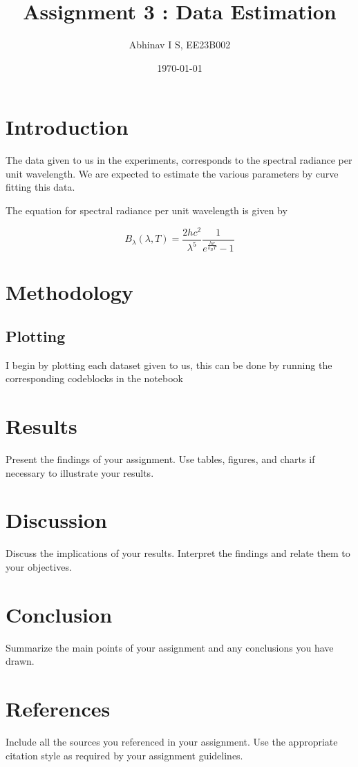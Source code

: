 \documentclass[a4paper,12pt]{article}
\title{Assignment 3 : Data Estimation}
\author{Abhinav I S, EE23B002}
\date{\today}
\begin{document}
\maketitle

\begin{abstract}
    
\end{abstract}

\section{Introduction}
The data given to us in the experiments, corresponds to the spectral radiance per 
unit wavelength. We are expected to estimate the various parameters by curve fitting
this data. 

The equation for spectral radiance per unit wavelength is given by

$$
B_{\lambda}(\lambda, T) = \frac{2 h c^{2}}{\lambda^{5}} \frac{1}{e^{\frac{h \nu}{k_{B} T}}-1}
$$

\section{Methodology}
\subsection{Plotting}
I begin by plotting each dataset given to us, this can be done by running
the corresponding codeblocks in the notebook

\section{Results}
Present the findings of your assignment. Use tables, figures, and charts if necessary to illustrate your results.

\section{Discussion}
Discuss the implications of your results. Interpret the findings and relate them to your objectives.

\section{Conclusion}
Summarize the main points of your assignment and any conclusions you have drawn.

\section{References}
Include all the sources you referenced in your assignment. Use the appropriate citation style as required by your assignment guidelines.

% 
% 
\end{document}
